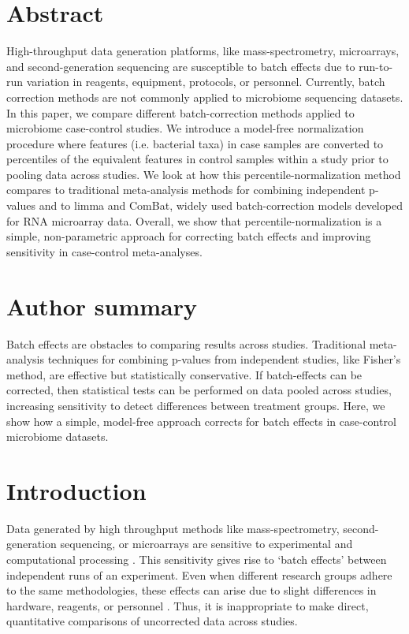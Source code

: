 \section*{Abstract}

High-throughput data generation platforms, like mass-spectrometry, microarrays, and second-generation sequencing are susceptible to batch effects due to run-to-run variation in reagents, equipment, protocols, or personnel. Currently, batch correction methods are not commonly applied to microbiome sequencing datasets. In this paper, we compare different batch-correction methods applied to microbiome case-control studies. We introduce a model-free normalization procedure where features (i.e. bacterial taxa) in case samples are converted to percentiles of the equivalent features in control samples within a study prior to pooling data across studies. We look at how this percentile-normalization method compares to traditional meta-analysis methods for combining independent p-values and to limma and ComBat, widely used batch-correction models developed for RNA microarray data. Overall, we show that percentile-normalization is a simple, non-parametric approach for correcting batch effects and improving sensitivity in case-control meta-analyses.

\section*{Author summary}

Batch effects are obstacles to comparing results across studies. Traditional meta-analysis techniques for combining p-values from independent studies, like Fisher's method, are effective but statistically conservative. If batch-effects can be corrected, then statistical tests can be performed on data pooled across studies, increasing sensitivity to detect differences between treatment groups. Here, we show how a simple, model-free approach corrects for batch effects in case-control microbiome datasets.

\section{Introduction}

Data generated by high throughput methods like mass-spectrometry, second-generation sequencing, or microarrays are sensitive to experimental and computational processing \cite{1,2}.
This sensitivity gives rise to `batch effects' between independent runs of an experiment.
Even when different research groups adhere to the same methodologies, these effects can arise due to slight differences in hardware, reagents, or personnel \cite{3}.
Thus, it is inappropriate to make direct, quantitative comparisons of uncorrected data across studies.

